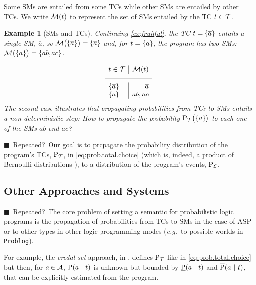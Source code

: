\documentclass[a4paper]{article}
\renewcommand{\cite}{\citep}
\newtheorem{example}{Example}
\newtheorem{example}{Example}
\newcommand{\eat}[1]{}
\newcommand{\at}[1]{\ensuremath{\!\del{#1}}}        %
\newcommand{\cla}[1]{\ensuremath{{\cal #1}}}        %
\newcommand{\co}[1]{\ensuremath{\overline{#1}}}     %
\newcommand{\ATOMSset}{\ensuremath{\cla{A}}}
\newcommand{\TCHOICEset}{\ensuremath{\cla{T}}}
\newcommand{\MODELset}{\ensuremath{\cla{M}}}
\newcommand{\EVENTSset}{\ensuremath{\cla{E}}}
\newcommand{\prfunc}{\ensuremath{\mathrm{P}}}
\newcommand{\pr}[1]{\ensuremath{\prfunc\at{#1}}}
\newcommand{\prd}[1]{\ensuremath{\prfunc_{#1}}}
\newcommand{\prT}{\prd{\TCHOICEset}}
\newcommand{\prE}{\prd{\EVENTSset}}
\newcommand{\given}{\ensuremath{~\middle|~}}
\newcommand{\tcgen}[1]{\MODELset\at{#1}}
\newcommand{\LOOK}{\ensuremath{\blacksquare}}
\newcommand{\franc}[1]{{\color{green!30!black}#1}}
\newcommand{\bruno}{\color{red!60!black}}
\begin{document}
Some \aclp{SM} are entailed from some \aclp{TC} while other \acp{SM}
are entailed by other \acp{TC}.  We write \(\tcgen{t}\) to represent
the set of \aclp{SM} entailed by the \acl{TC} \(t \in \TCHOICEset\).

\begin{example}[\Aclp{SM} and \aclp{TC}]%
  \em Continuing \cref{ex:fruitful}, the \acl{TC} \(t = \set{\co{a}}\)
  entails a single \acl{SM}, \(\co{a}\), so
  \( \MODELset\at{\set{\co{a}}} = \set{\co{a}} \) and, for
  \(t = \set{a}\), the program has two \aclp{SM}:
  \( \MODELset\at{\set{a}} = \set{ab, ac}\).

  \begin{equation*}
    \begin{array}{l|r}
      t \in \TCHOICEset   & \MODELset\at{t} \\
      \hline \set{\co{a}} & \co{a}          \\
      \set{a}             & ab, ac
    \end{array}
  \end{equation*}
  The second case illustrates that propagating probabilities from
  \aclp{TC} to \aclp{SM} entails a non-deterministic step: \textit{How
    to propagate the probability \(\prT\at{\set{a}}\) to each one of
    the \aclp{SM} \(ab\) and \(ac\)?}
\end{example}

%
\franc{\LOOK~Repeated?~}Our goal is to propagate the probability
distribution of the program's \aclp{TC}, \(\prT\), in
\cref{eq:prob.total.choice} (which is, indeed, a product of Bernoulli
distributions \cite{Teugels90}), to a distribution of the program's
events, \(\prE\).


\subsection*{Other Approaches and Systems}

\eat{\bruno This subsection seems out of place here! \franc{~Fixed?}}

\franc{\LOOK~Repeated?~}The core problem of setting a semantic for
probabilistic logic programs is the propagation of probabilities from
\aclp{TC} to \aclp{SM} in the case of \ac{ASP} or to other types in
other logic programming modes (\emph{e.g.}\ to possible worlds in
\texttt{Problog}).

For example, the \emph{credal set} approach, in \cite{cozman2020joy},
defines \(\prT\) like in \cref{eq:prob.total.choice} but then, for
\(a \in \ATOMSset\), \(\pr{a \given t}\) is unknown but bounded by
\(\underbar{\prfunc}\at{a \given t}\) and
\(\overline{\prfunc}\at{a \given t}\), that can be explicitly
estimated from the program.
\end{document}
